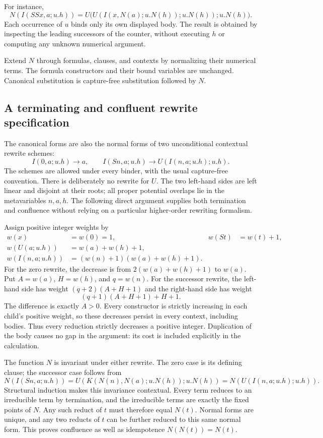 For instance,
\[
 N(I(SSx,a;u.h))
 =U\bigl(U(I(x,N(a);u.N(h));u.N(h));u.N(h)\bigr).
\]
Each occurrence of $u$ binds only its own displayed body.  The result
is obtained by inspecting the leading successors of the counter,
without executing $h$ or computing any unknown numerical argument.

Extend $N$ through formulas, clauses, and contexts by normalizing their
numerical terms.  The formula constructors and their bound variables
are unchanged.  Canonical substitution is capture-free substitution
followed by $N$.

\subsection{A terminating and confluent rewrite specification}

The canonical forms are also the normal forms of two unconditional
contextual rewrite schemes:
\[
 I(0,a;u.h)\longrightarrow a,
 \qquad
 I(Sn,a;u.h)\longrightarrow U(I(n,a;u.h);u.h).
 \tag{ZF}
\]
The schemes are allowed under every binder, with the usual
capture-free convention.  There is deliberately no rewrite for $U$.
The two left-hand sides are left linear and disjoint at their roots;
all proper potential overlaps lie in the metavariables $n,a,h$.
The following direct argument supplies both termination and confluence
without relying on a particular higher-order rewriting formalism.

Assign positive integer weights by
\begin{align*}
 w(x)&=w(0)=1,&w(St)&=w(t)+1,\\
 w(U(a;u.h))&=w(a)+w(h)+1,\\
 w(I(n,a;u.h))&=(w(n)+1)(w(a)+w(h)+1).
\end{align*}
For the zero rewrite, the decrease is from
$2(w(a)+w(h)+1)$ to $w(a)$.  Put $A=w(a)$, $H=w(h)$, and $q=w(n)$.
For the successor rewrite, the left-hand side has weight
$(q+2)(A+H+1)$ and the right-hand side has weight
\[
             (q+1)(A+H+1)+H+1.
\]
The difference is exactly $A>0$.  Every constructor is strictly
increasing in each child's positive weight, so these decreases persist
in every context, including bodies.  Thus every reduction strictly
decreases a positive integer.  Duplication of the body causes no gap in
the argument: its cost is included explicitly in the calculation.

The function $N$ is invariant under either rewrite.  The zero case is
its defining clause; the successor case follows from
\[
 N(I(Sn,a;u.h))
 =U(K(N(n),N(a);u.N(h));u.N(h))
 =N(U(I(n,a;u.h);u.h)).
\]
Structural induction makes this invariance contextual.  Every term
reduces to an irreducible term by termination, and the irreducible terms
are exactly the fixed points of $N$.  Any such reduct of $t$ must
therefore equal $N(t)$.  Normal forms are unique, and any two reducts
of $t$ can be further reduced to this same normal form.  This proves
confluence as well as idempotence $N(N(t))=N(t)$.


